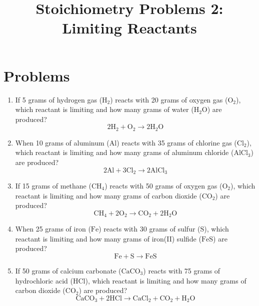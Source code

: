 \documentclass{article}
\title{Stoichiometry Problems 2: Limiting Reactants}
\author{}
\date{}
\begin{document}
\maketitle

\section*{Problems}

\begin{enumerate}
    \item If 5 grams of hydrogen gas (\(\text{H}_2\)) reacts with 20 grams of oxygen gas (\(\text{O}_2\)), which reactant is limiting and how many grams of water (\(\text{H}_2\text{O}\)) are produced?
    \[
    2\text{H}_2 + \text{O}_2 \rightarrow 2\text{H}_2\text{O}
    \]
    \item When 10 grams of aluminum (\(\text{Al}\)) reacts with 35 grams of chlorine gas (\(\text{Cl}_2\)), which reactant is limiting and how many grams of aluminum chloride (\(\text{AlCl}_3\)) are produced?
    \[
    2\text{Al} + 3\text{Cl}_2 \rightarrow 2\text{AlCl}_3
    \]
    \item If 15 grams of methane (\(\text{CH}_4\)) reacts with 50 grams of oxygen gas (\(\text{O}_2\)), which reactant is limiting and how many grams of carbon dioxide (\(\text{CO}_2\)) are produced?
    \[
    \text{CH}_4 + 2\text{O}_2 \rightarrow \text{CO}_2 + 2\text{H}_2\text{O}
    \]
    \item When 25 grams of iron (\(\text{Fe}\)) reacts with 30 grams of sulfur (\(\text{S}\)), which reactant is limiting and how many grams of iron(II) sulfide (\(\text{FeS}\)) are produced?
    \[
    \text{Fe} + \text{S} \rightarrow \text{FeS}
    \]
    \item If 50 grams of calcium carbonate (\(\text{CaCO}_3\)) reacts with 75 grams of hydrochloric acid (\(\text{HCl}\)), which reactant is limiting and how many grams of carbon dioxide (\(\text{CO}_2\)) are produced?
    \[
    \text{CaCO}_3 + 2\text{HCl} \rightarrow \text{CaCl}_2 + \text{CO}_2 + \text{H}_2\text{O}
    \]
\end{enumerate}
\end{document}
